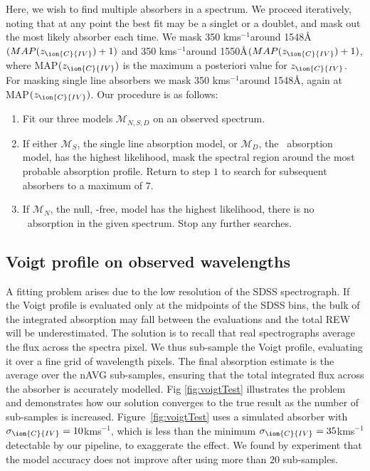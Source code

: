 \documentclass[fleqn,usenatbib]{mnras}
\newcommand{\civ}{\ion{C}{IV}}
\newcommand{\zciv}{z_{\civ}}
\newcommand{\sciv}{\sigma_{\civ}}
\newcommand{\kms}{kms$^{-1}$} %
\newcommand{\model}{\mathcal{M}}
\begin{document}
Here, we wish to find multiple absorbers in a spectrum. We proceed iteratively, noting that at any point the best fit may be a singlet or a doublet, and mask out the most likely absorber each time. We mask
350 \kms around 1548\AA$(MAP(\zciv)+1)$ and 350 \kms around
1550\AA$(MAP(\zciv)+1)$, where MAP$(\zciv)$ is the maximum a posteriori value for  $\zciv$. For masking single line absorbers we mask 350 \kms around 1548\AA, again at MAP$(\zciv)$. Our procedure is as follows:
\begin{enumerate}
  \item Fit our three models $\model_{N,S,D}$ on an observed spectrum.
  \item If either $\model_S$, the single line absorption model, or $\model_D$, the \civ\ absorption model, has the highest likelihood, mask the spectral region around the most probable absorption profile. Return to step $1$ to search for subsequent absorbers to a maximum of $7$.
  \item If $\model_N$, the null, \civ-free, model has the highest likelihood, there is no \civ\ absorption in the given spectrum. Stop any further searches.
  \end{enumerate}

\subsection{Voigt profile on observed wavelengths}

A fitting problem arises due to the low resolution of the SDSS spectrograph.
If the Voigt profile is evaluated only at the midpoints of the SDSS bins, the bulk
of the integrated absorption may fall between the evaluations and the total REW will be underestimated.
The solution is to recall that real spectrographs average the flux across the spectra pixel. We thus sub-sample the Voigt profile, evaluating it over a fine grid of wavelength pixels.
The final absorption estimate is the average over the nAVG sub-samples, ensuring that the total integrated flux across the absorber is accurately modelled. Fig \ref{fig:voigtTest} illustrates the problem and demonstrates how our solution converges to the true result as the number of sub-samples is increased.
Figure~\ref{fig:voigtTest} uses a simulated absorber with
$\sciv=10$\kms, which is less than the minimum $\sciv=35$\kms detectable by our pipeline, to exaggerate the effect. We found by experiment that the model accuracy does not improve after using more than $20$ sub-samples.
\end{document}
